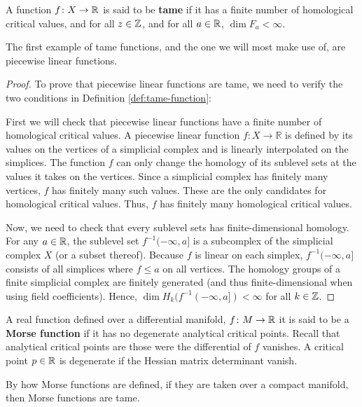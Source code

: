 \begin{definition} \label{def:tame-function}
    A function $ f\colon X \to \mathbb R $ is said to be {\bf tame} if it has a finite number of homological critical values, and for all $ z \in \mathbb Z $, and for all $ a \in \mathbb R $, $ \dim F_a < \infty $.
\end{definition}

\begin{example}
    The first example of tame functions, and the one we will most make use of, are piecewise linear functions.
\end{example}
\begin{proof}
    To prove that piecewise linear functions are tame, we need to verify the two conditions in Definition \ref{def:tame-function}:

    First we will check that piecewise linear functions have a finite number of homological critical values. A piecewise linear function $ f \colon X \to \mathbb{R} $ is defined by its values on the vertices of a simplicial complex and is linearly interpolated on the simplices. The function $ f $ can only change the homology of its sublevel sets at the values it takes on the vertices. Since a simplicial complex has finitely many vertices, $ f $ has finitely many such values. These are the only candidates for homological critical values. Thus, $ f $ has finitely many homological critical values.

    Now, we need to check that every sublevel sets has finite-dimensional homology. For any $ a \in \mathbb R $, the sublevel set $ f^{-1}(-\infty, a] $ is a subcomplex of the simplicial complex $ X $ (or a subset thereof). Because $ f $ is linear on each simplex, $ f^{-1}(-\infty, a] $ consists of all simplices where $ f \leq a $ on all vertices. The homology groups of a finite simplicial complex are finitely generated (and thus finite-dimensional when using field coefficients). Hence, $ \dim H_k(f^{-1}(-\infty, a]) < \infty $ for all $ k \in \mathbb Z $.
\end{proof}

\begin{example}
    A real function defined over a differential manifold, $ f\colon M \to \mathbb R $ it is said to be a {\bf Morse function} if it has no degenerate analytical critical points. Recall that analytical critical points are those were the differential of $ f $ vanishes. A critical point $ p \in \mathbb R $ is degenerate if the Hessian matrix determinant vanish.

    By how Morse functions are defined, if they are taken over a compact manifold, then Morse functions are tame.
\end{example}

